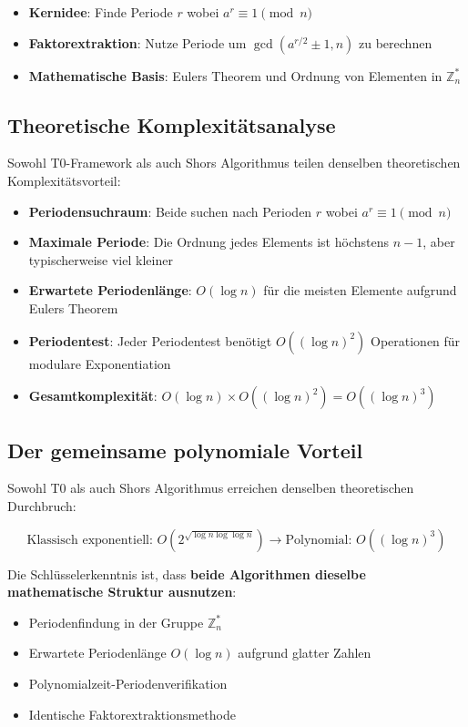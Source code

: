 	\begin{itemize}
		\item \textbf{Kernidee}: Finde Periode $r$ wobei $a^r \equiv 1 \pmod{n}$
		\item \textbf{Faktorextraktion}: Nutze Periode um $\gcd(a^{r/2} \pm 1, n)$ zu berechnen
		\item \textbf{Mathematische Basis}: Eulers Theorem und Ordnung von Elementen in $\mathbb{Z}_n^*$
	\end{itemize}
	
	\subsection{Theoretische Komplexitätsanalyse}
	
	Sowohl T0-Framework als auch Shors Algorithmus teilen denselben theoretischen Komplexitätsvorteil:
	
	\begin{itemize}
		\item \textbf{Periodensuchraum}: Beide suchen nach Perioden $r$ wobei $a^r \equiv 1 \pmod{n}$
		\item \textbf{Maximale Periode}: Die Ordnung jedes Elements ist höchstens $n-1$, aber typischerweise viel kleiner
		\item \textbf{Erwartete Periodenlänge}: $O(\log n)$ für die meisten Elemente aufgrund Eulers Theorem
		\item \textbf{Periodentest}: Jeder Periodentest benötigt $O((\log n)^2)$ Operationen für modulare Exponentiation
		\item \textbf{Gesamtkomplexität}: $O(\log n) \times O((\log n)^2) = O((\log n)^3)$
	\end{itemize}
	
	\subsection{Der gemeinsame polynomiale Vorteil}
	
	Sowohl T0 als auch Shors Algorithmus erreichen denselben theoretischen Durchbruch:
	
	\begin{equation}
		\text{Klassisch exponentiell: } O(2^{\sqrt{\log n \log \log n}}) \rightarrow \text{Polynomial: } O((\log n)^3)
	\end{equation}
	
	Die Schlüsselerkenntnis ist, dass \textbf{beide Algorithmen dieselbe mathematische Struktur ausnutzen}:
	\begin{itemize}
		\item Periodenfindung in der Gruppe $\mathbb{Z}_n^*$
		\item Erwartete Periodenlänge $O(\log n)$ aufgrund glatter Zahlen
		\item Polynomialzeit-Periodenverifikation
		\item Identische Faktorextraktionsmethode
	\end{itemize}
	

